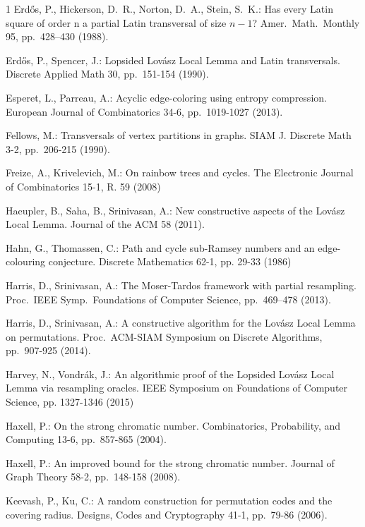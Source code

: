 \begin{thebibliography}{1}
Erd\H{o}s, P., Hickerson, D.\ R., Norton, D.\ A., Stein, S.\ K.: Has every Latin square of order n a partial Latin transversal of size $n-1$?
Amer.\ Math.\ Monthly 95, pp.\ 428–430 (1988). 

Erd\H{o}s, P., Spencer, J.: Lopsided Lov\'{a}sz Local Lemma and Latin transversals. Discrete Applied Math 30, pp.\ 151-154 (1990).

Esperet, L., Parreau, A.: Acyclic edge-coloring using entropy compression. European Journal of Combinatorics 34-6, pp.\ 1019-1027 (2013).

Fellows, M.: Transversals of vertex partitions in graphs. SIAM J. Discrete Math 3-2, pp.\ 206-215 (1990).


Freize, A., Krivelevich, M.: On rainbow trees and cycles. The Electronic Journal of Combinatorics 15-1, R. 59 (2008)

Haeupler, B., Saha, B., Srinivasan, A.: New constructive aspects of the Lov\'{a}sz Local Lemma. Journal of the ACM 58 (2011).

Hahn, G., Thomassen, C.: Path and cycle sub-Ramsey numbers and an edge-colouring conjecture. Discrete Mathematics 62-1, pp. 29-33 (1986)

Harris, D., Srinivasan, A.: The Moser-Tardos framework with partial resampling. Proc.\ IEEE Symp.\ Foundations of Computer Science, pp.\ 469--478 (2013).

Harris, D., Srinivasan, A.: A constructive algorithm for the Lov{\'{a}}sz Local Lemma on permutations.
Proc.\ {ACM-SIAM} Symposium on Discrete Algorithms, pp.\ 907-925 (2014).

Harvey, N., Vondr\'{a}k, J.: An algorithmic proof of the Lopsided Lov\'{a}sz Local Lemma via resampling oracles. IEEE Symposium on Foundations of Computer Science, pp. 1327-1346 (2015)

Haxell, P.: On the strong chromatic number. Combinatorics, Probability, and Computing 13-6, pp.\ 857-865 (2004).

Haxell, P.: An improved bound for the strong chromatic number. Journal of Graph Theory 58-2, pp.\ 148-158 (2008).

Keevash, P., Ku, C.: A random construction for permutation codes and the covering radius. Designs, Codes and Cryptography 41-1, pp.\ 79-86 (2006).


\end{thebibliography}
